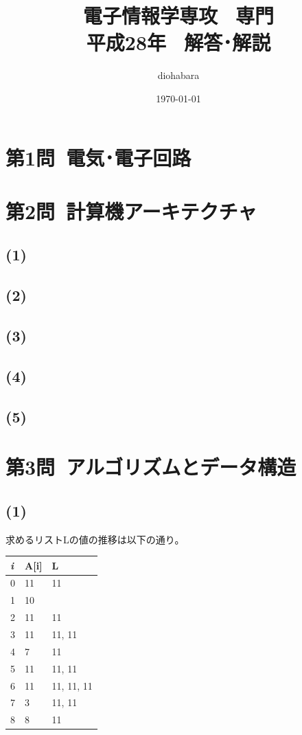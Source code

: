 \documentclass[a4paper,12pt,xelatex,ja=standard]{bxjsarticle}
\title{電子情報学専攻 \, 専門 \\ 平成28年 \, 解答･解説}
\author{diohabara}
\date{\today}
\begin{document}
\maketitle

\section*{第1問\ 電気･電子回路}

\section*{第2問\ 計算機アーキテクチャ}
\subsection*{(1)}

\subsection*{(2)}

\subsection*{(3)}

\subsection*{(4)}

\subsection*{(5)}

\section*{第3問\ アルゴリズムとデータ構造}
\subsection*{(1)}
求めるリストLの値の推移は以下の通り。
\begin{table}[]
  \begin{tabular}{|l|l|l|}
  \hline
  \textit{i} & A[i] & L            \\ \hline \hline
  0          & 11   & {11}         \\ \hline
  1          & 10   & {}           \\ \hline
  2          & 11   & {11}         \\ \hline
  3          & 11   & {11, 11}     \\ \hline
  4          & 7    & {11}         \\ \hline
  5          & 11   & {11, 11}     \\ \hline
  6          & 11   & {11, 11, 11} \\ \hline
  7          & 3    & {11, 11}     \\ \hline
  8          & 8    & {11}         \\ \hline
  \end{tabular}
\end{table}
\end{document}
